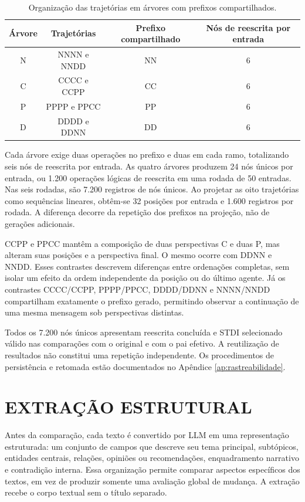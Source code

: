 \begin{table}[htb]
\centering
\caption{Organização das trajetórias em árvores com prefixos compartilhados.}
\label{tab:arvores-finais}
\begin{tabular}{cccc}
\hline
Árvore & Trajetórias & Prefixo compartilhado & Nós de reescrita por entrada \\
\hline
N & NNNN e NNDD & NN & 6 \\
C & CCCC e CCPP & CC & 6 \\
P & PPPP e PPCC & PP & 6 \\
D & DDDD e DDNN & DD & 6 \\
\hline
\end{tabular}
\end{table}

Cada árvore exige duas operações no prefixo e duas em cada ramo, totalizando seis nós de reescrita por entrada. As quatro árvores produzem 24 nós únicos por entrada, ou 1.200 operações lógicas de reescrita em uma rodada de 50 entradas. Nas seis rodadas, são 7.200 registros de nós únicos. Ao projetar as oito trajetórias como sequências lineares, obtêm-se 32 posições por entrada e 1.600 registros por rodada. A diferença decorre da repetição dos prefixos na projeção, não de gerações adicionais.

CCPP e PPCC mantêm a composição de duas perspectivas C e duas P, mas alteram suas posições e a perspectiva final. O mesmo ocorre com DDNN e NNDD. Esses contrastes descrevem diferenças entre ordenações completas, sem isolar um efeito da ordem independente da posição ou do último agente. Já os contrastes CCCC/CCPP, PPPP/PPCC, DDDD/DDNN e NNNN/NNDD compartilham exatamente o prefixo gerado, permitindo observar a continuação de uma mesma mensagem sob perspectivas distintas.

Todos os 7.200 nós únicos apresentam reescrita concluída e STDI selecionado válido nas comparações com o original e com o pai efetivo. A reutilização de resultados não constitui uma repetição independente. Os procedimentos de persistência e retomada estão documentados no Apêndice \ref{ap:rastreabilidade}.

\section{EXTRAÇÃO ESTRUTURAL}
\label{sec:metodos-extracao}

Antes da comparação, cada texto é convertido por LLM em uma representação estruturada: um conjunto de campos que descreve seu tema principal, subtópicos, entidades centrais, relações, opiniões ou recomendações, enquadramento narrativo e contradição interna. Essa organização permite comparar aspectos específicos dos textos, em vez de produzir somente uma avaliação global de mudança. A extração recebe o corpo textual sem o título separado.

